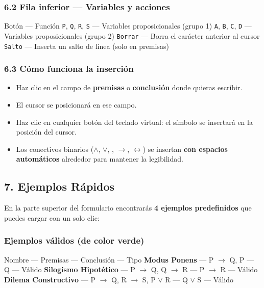 \documentclass[11pt,a4paper]{article}
\begin{document}
\subsubsection{6.2 Fila inferior --- Variables y acciones}

Botón --- Función
\texttt{P}, \texttt{Q}, \texttt{R}, \texttt{S} --- Variables proposicionales (grupo 1)
\texttt{A}, \texttt{B}, \texttt{C}, \texttt{D} --- Variables proposicionales (grupo 2)
\texttt{Borrar} --- Borra el carácter anterior al cursor
\texttt{Salto} --- Inserta un salto de línea (solo en premisas)

\subsubsection{6.3 Cómo funciona la inserción}

\begin{itemize}[leftmargin=*]
\item Haz clic en el campo de \textbf{premisas} o \textbf{conclusión} donde quieras escribir.
\item El cursor se posicionará en ese campo.
\item Haz clic en cualquier botón del teclado virtual: el símbolo se insertará en la posición del cursor.
\item Los conectivos binarios ($ \land $, $ \lor $, , $ \to $, $ \leftrightarrow $) se insertan \textbf{con espacios automáticos} alrededor para mantener la legibilidad.
\end{itemize}

\hrulefill

\subsection{7. Ejemplos Rápidos}

En la parte superior del formulario encontrarás \textbf{4 ejemplos predefinidos} que puedes cargar con un solo clic:

\subsubsection{Ejemplos válidos (de color verde)}

Nombre --- Premisas --- Conclusión --- Tipo
\textbf{Modus Ponens} --- P $ \to $ Q, P --- Q --- Válido
\textbf{Silogismo Hipotético} --- P $ \to $ Q, Q $ \to $ R --- P $ \to $ R --- Válido
\textbf{Dilema Constructivo} --- P $ \to $ Q, R $ \to $ S, P $ \lor $ R --- Q $ \lor $ S --- Válido
\end{document}
